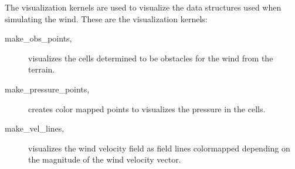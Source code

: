 The visualization kernels are used to visualize the data structures used when 
simulating the wind. These are the visualization kernels:

\begin{description}
	\item[make\_obs\_points,] visualizes the cells determined to be obstacles 
	for the wind from the terrain. 
	\item[make\_pressure\_points,] creates color mapped points to visualizes the 
	pressure in the cells. 
	\item[make\_vel\_lines,] visualizes the wind velocity field as field lines 
	colormapped depending on the magnitude of the wind velocity vector. 
\end{description}

